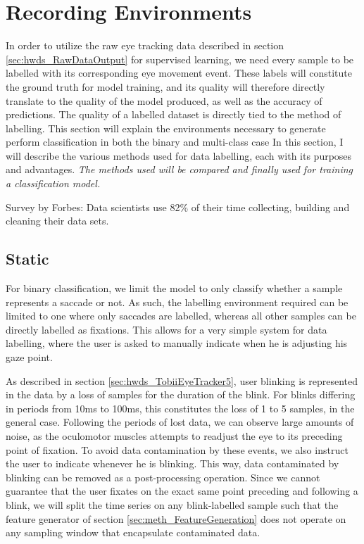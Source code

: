 \section{Recording Environments} \label{sec:meth_RecordingEnvironments}

In order to utilize the raw eye tracking data described in section \ref{sec:hwds_RawDataOutput} for supervised learning, we need every sample to be labelled with its corresponding eye movement event. These labels will constitute the ground truth for model training, and its quality will therefore directly translate to the quality of the model produced, as well as the accuracy of predictions. The quality of a labelled dataset is directly tied to the method of labelling. This section will explain the environments necessary to generate perform classification in both the binary and multi-class case
In this section, I will describe the various methods used for data labelling, each with its purposes and advantages. \textit{The methods used will be compared and finally used for training a classification model.}

Survey by Forbes: Data scientists use 82\% of their time collecting, building and cleaning their data sets. 

\subsection{Static}
For binary classification, we limit the model to only classify whether a sample represents a saccade or not. As such, the labelling environment required can be limited to one where only saccades are labelled, whereas  all other samples can be directly labelled as fixations. This allows for a very simple system for data labelling, where the user is asked to manually indicate when he is adjusting his gaze point.

As described in section \ref{sec:hwds_TobiiEyeTracker5}, user blinking is represented in the data by a loss of samples for the duration of the blink. For blinks differing in periods from 10ms to 100ms, this constitutes the loss of 1 to 5 samples, in the general case. Following the periods of lost data, we can observe large amounts of noise, as the oculomotor muscles attempts to readjust the eye to its preceding point of fixation. To avoid data contamination by these events, we also instruct the user to indicate whenever he is blinking. This way, data contaminated by blinking can be removed as a post-processing operation. Since we cannot guarantee that the user fixates on the exact same point preceding and following a blink, we will split the time series on any blink-labelled sample such that the feature generator of section \ref{sec:meth_FeatureGeneration} does not operate on any sampling window that encapsulate contaminated data. 

